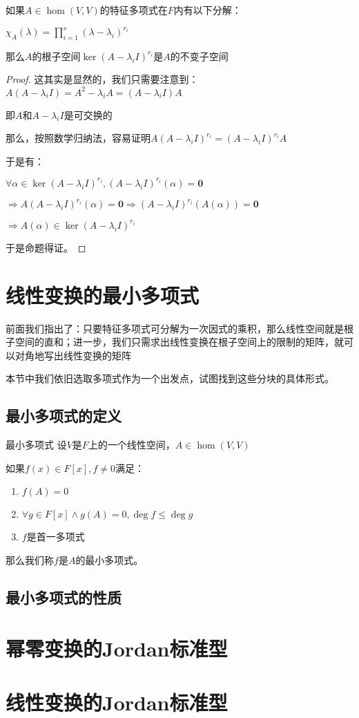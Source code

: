 \documentclass[12pt, a4paper, oneside, UTF8]{ctexbook}
\begin{document}
\begin{para}{0}
\begin{proposition}
						如果$A \in \hom(V,V)$的特征多项式在$F$内有以下分解：

						$\chi_A (\lambda )=\prod\limits_{i=1}^{s} (\lambda-\lambda_i)^{r_i}$

						那么$A$的根子空间$\ker (A-\lambda_iI)^{r_i}$是$A$的不变子空间
					\end{proposition}
					\begin{proof}
						这其实是显然的，我们只需要注意到：$A(A-\lambda_i I)=A^2 - \lambda_i A = (A-\lambda_i I)A$
						
						即$A$和$A-\lambda_i I$是可交换的

						那么，按照数学归纳法，容易证明$A(A-\lambda_i I)^{r_i}=(A-\lambda_i I)^{r_i}A$

						于是有：

						$\forall \alpha \in \ker (A-\lambda_iI)^{r_i},(A-\lambda_iI)^{r_i}(\alpha )=\mathbf{0}$

						$\Rightarrow A(A-\lambda_iI)^{r_i}(\alpha )=\mathbf{0} \Rightarrow (A-\lambda_iI)^{r_i}(A(\alpha )) = \mathbf{0}$

						$\Rightarrow A(\alpha ) \in \ker (A-\lambda_iI)^{r_i}$

						于是命题得证。
					\end{proof}
			\end{para}
	\section{线性变换的最小多项式}
		前面我们指出了：只要特征多项式可分解为一次因式的乘积，那么线性空间就是根子空间的直和；进一步，我们只需求出线性变换在根子空间上的限制的矩阵，就可以对角地写出线性变换的矩阵

		本节中我们依旧选取多项式作为一个出发点，试图找到这些分块的具体形式。
		\subsection{最小多项式的定义}
			\begin{defn}{最小多项式}{}
				设$V$是$F$上的一个线性空间，$A \in \hom(V,V)$

				如果$f(x) \in F[x],f \neq 0$满足：

				\begin{enumerate}
					\item $f(A) = 0$
					\item $\forall g \in F[x] \wedge g(A) = 0,\operatorname{deg} f \leqslant \operatorname{deg} g$
					\item $f$是首一多项式
				\end{enumerate}
				那么我们称$f$是$A$的最小多项式。
			\end{defn}
		\subsection{最小多项式的性质}
			
	\section{幂零变换的Jordan标准型}
	\section{线性变换的Jordan标准型}
\ifx\allfiles\undefined
\end{document}
